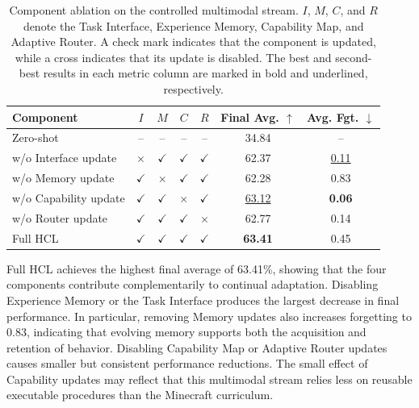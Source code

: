 \documentclass{article}
\begin{document}
\begin{table}[t]
    \centering
    \caption{
        Component ablation on the controlled multimodal stream.
        $I$, $M$, $C$, and $R$ denote the Task Interface, Experience Memory,
        Capability Map, and Adaptive Router. A check mark indicates that the
        component is updated, while a cross indicates that its update is
        disabled. The best and second-best results in each metric column are
        marked in bold and underlined, respectively.
    }
    \label{tab:component_ablation}
        \begin{tabular}{lcccc|cc}
            \toprule
            Component
            & $I$
            & $M$
            & $C$
            & $R$
            & Final Avg. $\uparrow$
            & Avg. Fgt. $\downarrow$ \\
            \midrule

            Zero-shot
            & -- & -- & -- & --
            & 34.84
            & -- \\

            w/o Interface update
            & $\times$ & $\checkmark$ & $\checkmark$ & $\checkmark$
            & 62.37
            & \underline{0.11} \\

            w/o Memory update
            & $\checkmark$ & $\times$ & $\checkmark$ & $\checkmark$
            & 62.28
            & 0.83 \\

            w/o Capability update
            & $\checkmark$ & $\checkmark$ & $\times$ & $\checkmark$
            & \underline{63.12}
            & \textbf{0.06} \\

            w/o Router update
            & $\checkmark$ & $\checkmark$ & $\checkmark$ & $\times$
            & 62.77
            & 0.14 \\

            Full HCL
            & $\checkmark$ & $\checkmark$ & $\checkmark$ & $\checkmark$
            & \textbf{63.41}
            & 0.45 \\

            \bottomrule
        \end{tabular}
\end{table}

Full HCL achieves the highest final average of 63.41\%, showing that the four
components contribute complementarily to continual adaptation. Disabling
Experience Memory or the Task Interface produces the largest decrease in final
performance. In particular, removing Memory updates also increases forgetting
to 0.83, indicating that evolving memory supports both the acquisition and
retention of behavior. Disabling Capability Map or Adaptive Router updates
causes smaller but consistent performance reductions. The small effect of Capability updates may reflect that this multimodal stream relies less on reusable executable procedures than the Minecraft curriculum.
\end{document}
